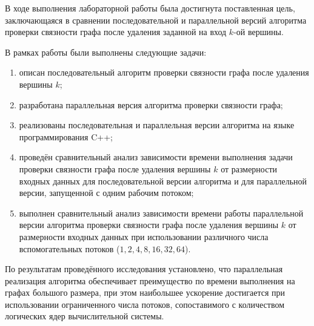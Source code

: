 
В ходе выполнения лабораторной работы была достигнута поставленная цель, заключающаяся в сравнении последовательной и параллельной версий алгоритма проверки связности графа после удаления заданной на вход $k$-ой вершины.

В рамках работы были выполнены следующие задачи:
\begin{enumerate}
	\item описан последовательный алгоритм проверки связности графа после удаления вершины $k$;
	\item разработана параллельная версия алгоритма проверки связности графа;
	\item реализованы последовательная и параллельная версии алгоритма на языке программирования C++;
	\item проведён сравнительный анализ зависимости времени выполнения задачи проверки связности графа после удаления вершины $k$ от размерности входных данных для последовательной версии алгоритма и для параллельной версии, запущенной с одним рабочим потоком;
	\item выполнен сравнительный анализ зависимости времени работы параллельной версии алгоритма проверки связности графа после удаления вершины $k$ от размерности входных данных при использовании различного числа вспомогательных потоков ($1, 2, 4, 8, 16, 32, 64$).
\end{enumerate}

По результатам проведённого исследования установлено, что параллельная реализация алгоритма обеспечивает преимущество по времени выполнения на графах большого размера, при этом наибольшее ускорение достигается при использовании ограниченного числа потоков, сопоставимого с количеством логических ядер вычислительной системы.
